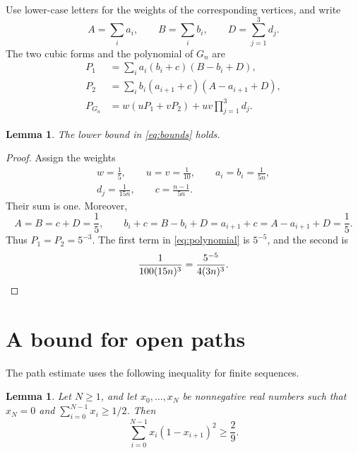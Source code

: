 \documentclass[11pt]{article}
\newtheorem{lemma}[theorem]{Lemma}
\numberwithin{equation}{section}
\begin{document}
Use lower-case letters for the weights of the corresponding vertices,
and write
\[
 A=\sum_i a_i,\qquad B=\sum_i b_i,\qquad
 D=\sum_{j=1}^{3}d_j.
\]
The two cubic forms and the polynomial of \(G_n\) are
\begin{align}
 P_1&=\sum_i a_i(b_i+c)(B-b_i+D),\label{eq:p1}\\
 P_2&=\sum_i b_i(a_{i+1}+c)(A-a_{i+1}+D),\label{eq:p2}\\
 P_{G_n}&=w(uP_1+vP_2)+uv\prod_{j=1}^{3}d_j.
 \label{eq:polynomial}
\end{align}

\begin{lemma}\label{lem:lower}
The lower bound in \eqref{eq:bounds} holds.
\end{lemma}

\begin{proof}
Assign the weights
\begin{equation}\label{eq:weights}
 \begin{gathered}
 w=\frac1{5},\qquad u=v=\frac1{10},\qquad
 a_i=b_i=\frac1{5n},\\
 d_j=\frac1{15n},\qquad c=\frac{n-1}{5n}.
 \end{gathered}
\end{equation}
Their sum is one. Moreover,
\[
 A=B=c+D=\frac1{5},\qquad
 b_i+c=B-b_i+D=a_{i+1}+c=A-a_{i+1}+D=\frac1{5}.
\]
Thus \(P_1=P_2=5^{-3}\). The first term in
\eqref{eq:polynomial} is \(5^{-5}\), and the second is
\[
 \frac1{100(15n)^{3}}
 =\frac{5^{-5}}{4(3n)^{3}}.\qedhere
\]
\end{proof}

\section{A bound for open paths}\label{sec:paths}

The path estimate uses the following inequality for finite sequences.

\begin{lemma}\label{lem:energy}
Let \(N\ge1\), and let \(x_0,\ldots,x_N\) be nonnegative real numbers
such that \(x_N=0\) and \(\sum_{i=0}^{N-1}x_i\ge1/2\). Then
\begin{equation}\label{eq:sequence-energy}
 \sum_{i=0}^{N-1}x_i(1-x_{i+1})^2\ge\frac29.
\end{equation}
\end{lemma}
\end{document}
